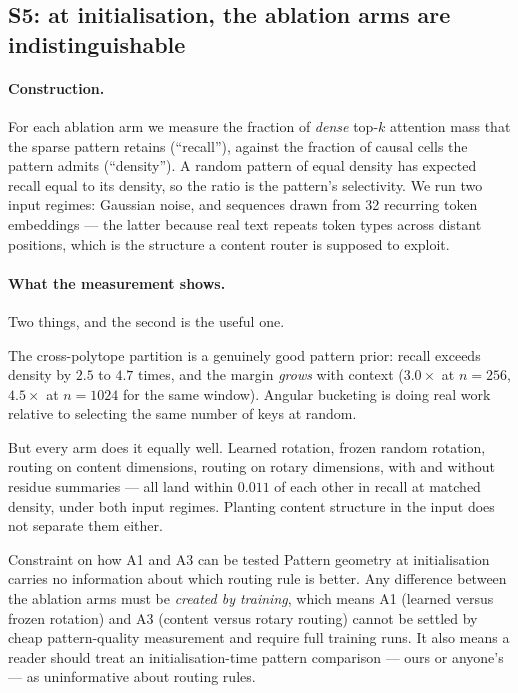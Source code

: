 \subsection{S5: at initialisation, the ablation arms are indistinguishable}
\label{sec:s5}

\paragraph{Construction.} For each ablation arm we measure the fraction of \emph{dense} top-$k$ attention mass that the sparse pattern retains (``recall''), against the fraction of causal cells the pattern admits (``density''). A random pattern of equal density has expected recall equal to its density, so the ratio is the pattern's selectivity. We run two input regimes: Gaussian noise, and sequences drawn from 32 recurring token embeddings --- the latter because real text repeats token types across distant positions, which is the structure a content router is supposed to exploit.

\begin{table}[h]
\centering
\small

\caption{Pattern selectivity at initialisation ($d=128$, 4 heads, window 8, $k=32$). Angular bucketing beats a random pattern of equal density by a factor of three to five, but no arm is distinguishable from any other, in either input regime.}
\label{tab:s5}
\end{table}

\paragraph{What the measurement shows.} Two things, and the second is the useful one.

The cross-polytope partition is a genuinely good pattern prior: recall exceeds density by $2.5$ to $4.7$ times, and the margin \emph{grows} with context ($3.0\times$ at $n=256$, $4.5\times$ at $n=1024$ for the same window). Angular bucketing is doing real work relative to selecting the same number of keys at random.

But every arm does it equally well. Learned rotation, frozen random rotation, routing on content dimensions, routing on rotary dimensions, with and without residue summaries --- all land within $0.011$ of each other in recall at matched density, under both input regimes. Planting content structure in the input does not separate them either.

\begin{revision}{Constraint on how A1 and A3 can be tested}
Pattern geometry at initialisation carries no information about which routing rule is better. Any difference between the ablation arms must be \emph{created by training}, which means A1 (learned versus frozen rotation) and A3 (content versus rotary routing) cannot be settled by cheap pattern-quality measurement and require full training runs. It also means a reader should treat an initialisation-time pattern comparison --- ours or anyone's --- as uninformative about routing rules.
\end{revision}

